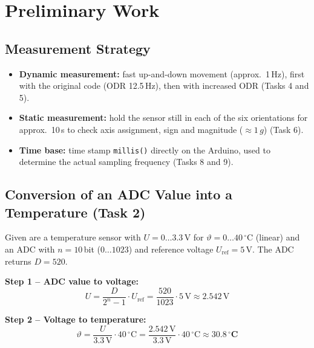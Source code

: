 \documentclass[a4paper,oneside,10pt]{article}
\begin{document}
\section{Preliminary Work}

\subsection{Measurement Strategy}

\begin{itemize}
  \item \textbf{Dynamic measurement:} fast up-and-down movement (approx.\ 1\,Hz), first with
        the original code (ODR 12.5\,Hz), then with increased ODR (Tasks 4 and 5).
  \item \textbf{Static measurement:} hold the sensor still in each of the six orientations for
        approx.\ 10\,s to check axis assignment, sign and magnitude ($\approx 1\,g$)
        (Task 6).
  \item \textbf{Time base:} time stamp \texttt{millis()} directly on the Arduino, used to
        determine the actual sampling frequency (Tasks 8 and 9).
\end{itemize}

\subsection{Conversion of an ADC Value into a Temperature (Task 2)}

Given are a temperature sensor with $U = 0 \ldots 3.3$\,V for
$\vartheta = 0 \ldots 40\,^\circ$C (linear) and an ADC with $n = 10$\,bit
($0 \ldots 1023$) and reference voltage $U_\mathrm{ref} = 5$\,V. The ADC returns
$D = 520$.

\textbf{Step 1 -- ADC value to voltage:}
\begin{equation}
  U = \frac{D}{2^{n}-1}\cdot U_\mathrm{ref} = \frac{520}{1023}\cdot 5\,\mathrm{V} \approx 2.542\,\mathrm{V}
\end{equation}

\textbf{Step 2 -- Voltage to temperature:}
\begin{equation}
  \vartheta = \frac{U}{3.3\,\mathrm{V}}\cdot 40\,^\circ\mathrm{C}
            = \frac{2.542\,\mathrm{V}}{3.3\,\mathrm{V}}\cdot 40\,^\circ\mathrm{C}
            \approx \mathbf{30.8\,^\circ C}
\end{equation}
\end{document}
